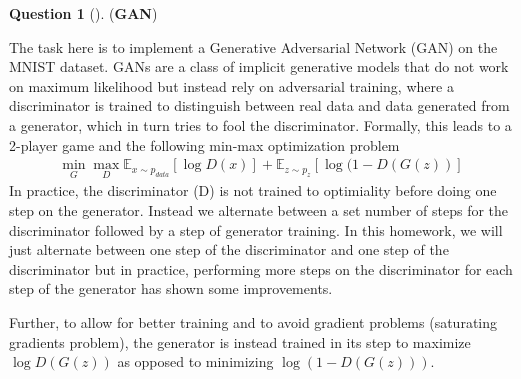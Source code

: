 \documentclass[12pt]{article}
\theoremstyle{definition}
\newtheorem{exercise}{Question}%
\begin{document}
\begin{exercise}[] (\textbf{GAN}) 

The task here is to implement a Generative Adversarial Network (GAN) on the MNIST dataset. GANs are a class of implicit generative models that do not work on maximum likelihood but instead rely on adversarial training, where a discriminator is trained to distinguish between real data and data generated from a generator, which in turn tries to fool the discriminator. Formally, this leads to a 2-player game and the following min-max optimization problem
\begin{align*}
    \min_G \max_D \mathbb{E}_{x\sim p_{data}}[\log D(x)] + \mathbb{E}_{z\sim p_z} [\log (1 - D(G(z))]
\end{align*}
In practice, the discriminator (D) is not trained to optimiality before doing one step on the generator. Instead we alternate between a set number of steps for the discriminator followed by a step of generator training. In this homework, we will just alternate between one step of the discriminator and one step of the discriminator but in practice, performing more steps on the discriminator for each step of the generator has shown some improvements.

Further, to allow for better training and to avoid gradient problems (saturating gradients problem), the generator is instead trained in its step to maximize $\log D(G(z))$ as opposed to minimizing $\log (1 - D(G(z)))$.


\end{exercise}
\end{document}
